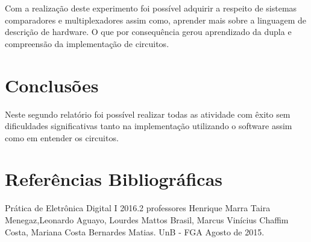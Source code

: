 \documentclass[12pts]{article}
\begin{document}
	Com a realização deste experimento foi possível adquirir a respeito de sistemas comparadores e multiplexadores assim como, aprender mais sobre a linguagem de descrição de hardware. O que por consequência gerou aprendizado da dupla e compreensão da implementação de circuitos.

\section{Conclusões}

	Neste segundo relatório foi possível realizar todas as atividade com êxito sem dificuldades significativas tanto na implementação utilizando o software assim como em entender os circuitos.

\section{Referências Bibliográficas}

Prática de Eletrônica Digital I 2016.2 professores Henrique Marra Taira Menegaz,Leonardo Aguayo, Lourdes Mattos Brasil, Marcus Vinícius Chaffim Costa, Mariana Costa Bernardes Matias. UnB - FGA Agosto de 2015.

\newpage
\end{document}
